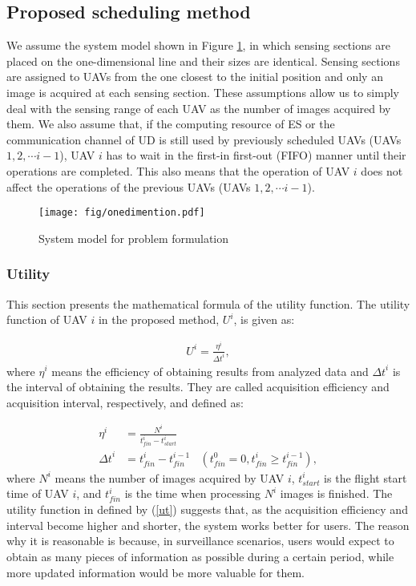 \documentclass{ieeeaccess}
\begin{document}
\subsection{Proposed scheduling method}\label{math}
We assume the system model shown in Figure  \ref{model1.5}, in which sensing sections are placed on the one-dimensional line and their sizes are identical.
%
Sensing sections are assigned to UAVs from the one closest to the initial position and only an image is acquired at each sensing section.
%
These assumptions allow us to simply deal with the sensing range of each UAV as the number of images acquired by them.
%
We also assume that, if the computing resource of ES or the communication channel of UD is still used by previously scheduled UAVs (UAVs $1, 2, \cdots i-1$), UAV $i$ has to wait in the first-in first-out (FIFO) manner until their operations are completed.
%
This also means that the operation of UAV $i$ does not affect the operations of the previous UAVs (UAVs $1, 2, \cdots i-1$).

\begin{figure}[t]
\begin{center}
\texttt{[image: fig/onedimention.pdf]}
\caption{System model for problem formulation}
\label{model1.5}
\end{center}
\end{figure}

\subsubsection{Utility}\label{to}
This section presents the mathematical formula of the utility function.
%
The utility function of UAV $i$ in the proposed method, $U^i$, is given as:

\begin{align}
U^i = \frac{\eta^i}{{\Delta{t}}^i}, \label{ut}
\end{align}
where $\eta^i$ means the efficiency of obtaining results from analyzed data and ${\Delta{t}}^i$ is the interval of obtaining the results.
%
They are called acquisition efficiency and acquisition interval, respectively, and defined as:

\begin{align}
\eta^i&=\frac{N^i}{{t_{fin}^i}-{t_{start}^i}} \label{f1}\\
{\Delta{t}}^i &= {t_{fin}^i}-t_{fin}^{i-1}~~~~(t_ {fin}^0=0, {t_{fin}^i}\geq{t_{fin}^{i-1}}), \label{f2}
\end{align}
where $N^i$ means the number of images acquired by UAV $i$, $t_{start}^i$ is the flight start time of UAV $i$, and $t_{fin}^i$ is the time when processing $N^i$ images is finished.
%
The utility function in defined by (\ref{ut}) suggests that, as the acquisition efficiency and interval become higher and shorter, the system works better for users.
%
The reason why it is reasonable is because, in surveillance scenarios, users would expect to obtain as many pieces of information as possible during a certain period, while more updated information would be more valuable for them.
\end{document}
